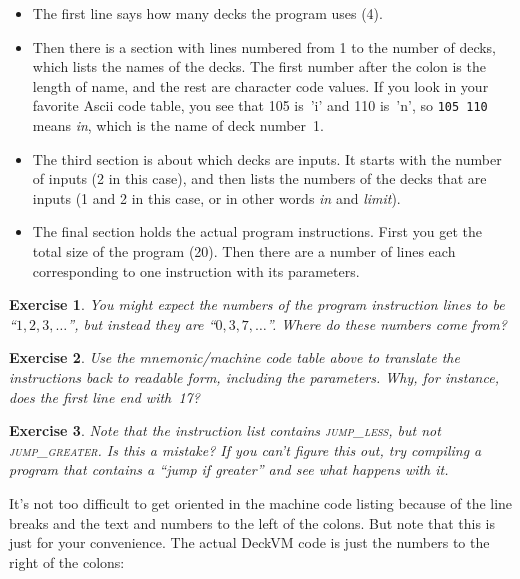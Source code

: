 \documentclass[a4paper,twoside]{tufte-handout}
\newtheorem{exercise}{Exercise}
\begin{document}
\begin{itemize}
\item The first line says how many decks the program uses (4).
\item Then there is a section with lines numbered from 1 to the number of decks,
  which lists the names of the decks. The first number after the colon
  is the length of name, and the rest are character code values. If you look
  in your favorite Ascii
  code table, you see that 105 is~'i' and 110
  is~'n', so \verb'105 110' means \emph{in}, which is the name of deck
  number~1.
\item The third section is about which decks are inputs. It starts
  with the number of inputs (2 in this case), and then lists the
  numbers of the decks that are inputs (1 and 2 in this case, or in
  other words \emph{in} and \emph{limit}).

\item The final section holds the actual program instructions. First you
  get the total size of the program (20). Then there are a number of
  lines each corresponding to one instruction with its parameters.
\end{itemize}

\begin{exercise}
  You might expect the numbers of the program instruction lines to be
  ``$1,2,3,\ldots$'', but instead they are ``$0,3,7,\ldots$''. Where do these
  numbers come from?
\end{exercise}

\begin{exercise}
  Use the mnemonic/machine code table above to translate
  the instructions back to readable form, including the
  parameters. Why, for instance, does the first line end with~17?
\end{exercise}

\begin{exercise}
  Note that the instruction list contains \textsc{jump\_less}, but not
  \textsc{jump\_greater}. Is this a mistake? If you can't figure this
  out, try compiling a program that contains a ``\emph{jump if greater}''
  and see what happens with it.
\end{exercise}

It's not too difficult to get oriented in the machine code listing
because of the line breaks and the text and numbers to the left of the
colons. But note that this is just for your convenience. The actual
DeckVM code is just the numbers to the right of the colons:
\end{document}
